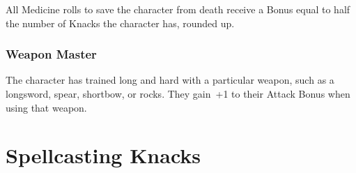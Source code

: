 \begin{multicols}{2}
All Medicine rolls to save the character from death receive a Bonus equal to half the number of Knacks the character has, rounded up.

\subsubsection{Weapon Master}

The character has trained long and hard with a particular weapon, such as a longsword, spear, shortbow, or rocks.
They gain~+1 to their Attack Bonus when using that weapon.

\end{multicols}

\section{Spellcasting Knacks}

